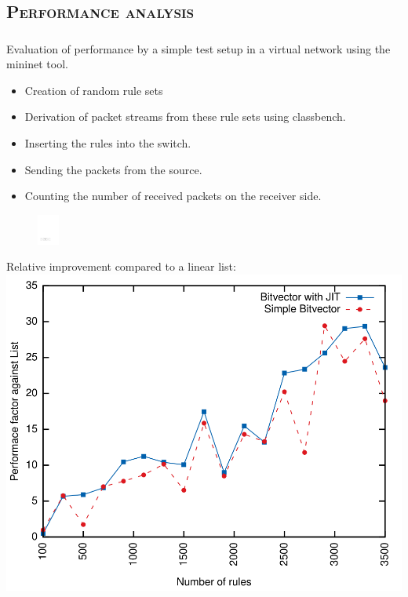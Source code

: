 \documentclass[xcolor=x11names,compress]{beamer}
\renewcommand{\(}{\begin{columns}}
\renewcommand{\)}{\end{columns}}
\newcommand{\<}[1]{\begin{column}{#1}}
\renewcommand{\>}{\end{column}}
\begin{document}
\subsection{\scshape Performance analysis}
\begin{frame}
  \frametitle{\insertsubsection}
  Evaluation of performance by a simple test setup in a virtual network using the \textsf{mininet} tool.
  \begin{itemize}
    \item Creation of random rule sets
    \item Derivation of packet streams from these rule sets using \textsf{classbench}.
    \item Inserting the rules into the switch.
    \item Sending the packets from the source.
    \item Counting the number of received packets on the receiver side.
  \end{itemize}
  \begin{figure}
  \centering
  \includegraphics[height=1cm]{figures/ofswitch-perftest}
  \end{figure}
\end{frame}

\begin{frame}
  Relative improvement compared to a linear list:
  \includegraphics[height=0.9\textheight]{figures/eval_w_relative}
\end{frame}
\end{document}
